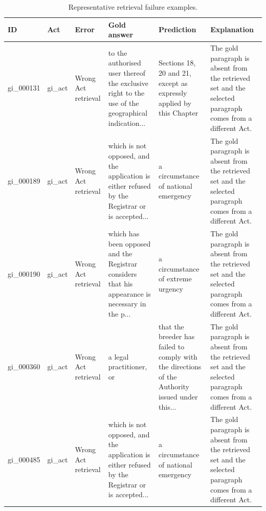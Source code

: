 \begin{table}[htbp]
\centering
\caption{Representative retrieval failure examples.}
\label{tab:retrieval_failure_examples}
\scriptsize
\begin{tabular}{llllll}
\toprule
ID & Act & Error & Gold answer & Prediction & Explanation \\
\midrule
gi\_000131 & gi\_act & Wrong Act retrieval & to the authorised user thereof the exclusive right to the use of the geographical indication... & Sections 18, 20 and 21, except as expressly applied by this Chapter & The gold paragraph is absent from the retrieved set and the selected paragraph comes from a different Act. \\
gi\_000189 & gi\_act & Wrong Act retrieval & which is not opposed, and the application is either refused by the Registrar or is accepted... & a circumstance of national emergency & The gold paragraph is absent from the retrieved set and the selected paragraph comes from a different Act. \\
gi\_000190 & gi\_act & Wrong Act retrieval & which has been opposed and the Registrar considers that his appearance is necessary in the p... & a circumstance of extreme urgency & The gold paragraph is absent from the retrieved set and the selected paragraph comes from a different Act. \\
gi\_000360 & gi\_act & Wrong Act retrieval & a legal practitioner, or & that the breeder has failed to comply with the directions of the Authority issued under this... & The gold paragraph is absent from the retrieved set and the selected paragraph comes from a different Act. \\
gi\_000485 & gi\_act & Wrong Act retrieval & which is not opposed, and the application is either refused by the Registrar or is accepted... & a circumstance of national emergency & The gold paragraph is absent from the retrieved set and the selected paragraph comes from a different Act. \\
\bottomrule
\end{tabular}
\end{table}
